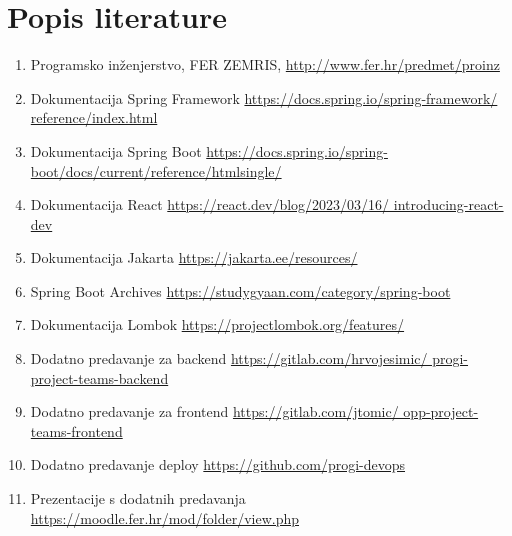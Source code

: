 \chapter*{Popis literature}
	 	
 		
		
		\begin{enumerate}
			
			
			\item  Programsko inženjerstvo, FER ZEMRIS, \url{http://www.fer.hr/predmet/proinz}
			\item Dokumentacija Spring Framework
			\url{https://docs.spring.io/spring-framework/  reference/index.html}
			\item Dokumentacija Spring Boot
			\url{https://docs.spring.io/spring-boot/docs/current/reference/htmlsingle/}
			\item Dokumentacija React
			\url{https://react.dev/blog/2023/03/16/          introducing-react-dev}
			\item Dokumentacija Jakarta
			\url{https://jakarta.ee/resources/}
			\item Spring Boot Archives
			\url{https://studygyaan.com/category/spring-boot}
			\item Dokumentacija Lombok
			\url{https://projectlombok.org/features/}
			\item Dodatno predavanje za backend
			\url{https://gitlab.com/hrvojesimic/  progi-project-teams-backend}
			\item Dodatno predavanje za frontend
			\url{https://gitlab.com/jtomic/  opp-project-teams-frontend}
			\item Dodatno predavanje deploy
			\url{https://github.com/progi-devops}
			\item Prezentacije s dodatnih predavanja
			\url{https://moodle.fer.hr/mod/folder/view.php}
			
			
		\end{enumerate}
		
		 
